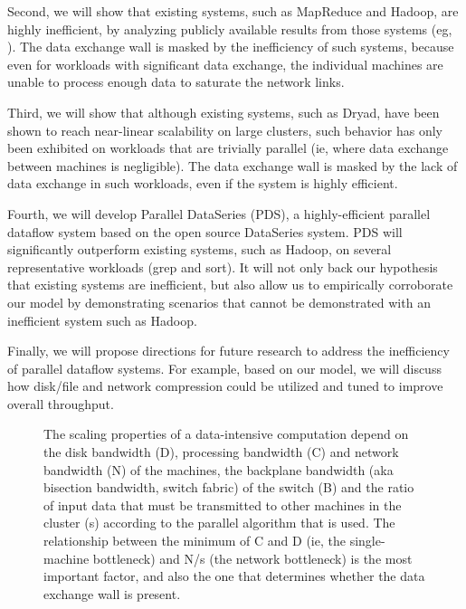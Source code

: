 \documentclass{acm_proc_article-sp}
\begin{document}
Second, we will show that existing systems, such as MapReduce and Hadoop, are highly inefficient, by analyzing publicly available results from those systems (eg, \cite{mapreduce}). The data exchange wall is masked by the inefficiency of such systems, because even for workloads with significant data exchange, the individual machines are unable to process enough data to saturate the network links.

Third, we will show that although existing systems, such as Dryad, have been shown to reach near-linear scalability on large clusters, such behavior has only been exhibited on workloads that are trivially parallel (ie, where data exchange between machines is negligible). The data exchange wall is masked by the lack of data exchange in such workloads, even if the system is highly efficient.

Fourth, we will develop Parallel DataSeries (PDS), a highly-efficient parallel dataflow system based on the open source DataSeries \cite{dataseries} system. PDS will significantly outperform existing systems, such as Hadoop, on several representative workloads (grep and sort). It will not only back our hypothesis that existing systems are inefficient, but also allow us to empirically corroborate our model by demonstrating scenarios that cannot be demonstrated with an inefficient system such as Hadoop.

Finally, we will propose directions for future research to address the inefficiency of parallel dataflow systems. For example, based on our model, we will discuss how disk/file and network compression could be utilized and tuned to improve overall throughput. 

\begin{figure*}[!b]
  \begin{center}
  \end{center}

  \caption{\small The scaling properties of a data-intensive computation depend on the disk bandwidth (D), processing bandwidth (C) and network bandwidth (N) of the machines, the backplane bandwidth (aka bisection bandwidth, switch fabric) of the switch (B) and the ratio of input data that must be transmitted to other machines in the cluster (s) according to the parallel algorithm that is used. The relationship between the minimum of C and D (ie, the single-machine bottleneck) and N/s (the network bottleneck) is the most important factor, and also the one that determines whether the data exchange wall is present.}
  \label{fig:model}
\end{figure*}
\end{document}
